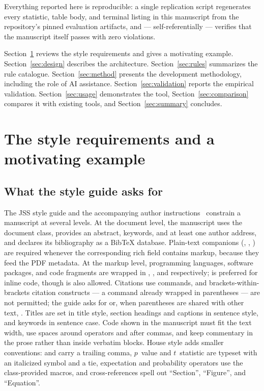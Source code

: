 \documentclass[nojss,article]{jss}
\providecommand{\BibTeX}{Bib\TeX{}}
\begin{document}
Everything reported here is reproducible: a single replication script
regenerates every statistic, table body, and terminal listing in this
manuscript from the repository's pinned evaluation artifacts, and ---
self-referentially --- verifies that the manuscript itself passes
 with zero violations.

Section~\ref{sec:styleguide} reviews the style requirements and gives
a motivating example. Section~\ref{sec:design} describes the
architecture. Section~\ref{sec:rules} summarizes the rule catalogue.
Section~\ref{sec:method} presents the development methodology,
including the role of AI assistance. Section~\ref{sec:validation}
reports the empirical validation. Section~\ref{sec:usage} demonstrates
the tool, Section~\ref{sec:comparison} compares it with existing
tools, and Section~\ref{sec:summary} concludes.

\section{The style requirements and a motivating example}
\label{sec:styleguide}

\subsection{What the style guide asks for}
\label{sec:requirements}

The JSS style guide and the accompanying author
instructions~\citep{jss_styleguide, jss_instructions} constrain a
manuscript at several levels. At the document level, the manuscript
uses the  document class, provides an abstract, keywords,
and at least one author address, and declares its bibliography as a
\BibTeX{} database. Plain-text companions
(,
,
) are required whenever the
corresponding rich field contains markup, because they feed the PDF
metadata. At the markup level, programming languages, software
packages, and code fragments are wrapped in
, , and
 respectively; 
is preferred for inline code, though  is
also allowed. Citations use  commands, and
brackets-within-brackets citation constructs --- a
 command already wrapped in parentheses
--- are not permitted; the guide asks for
 or, when parentheses are shared with
other text, . Titles are set in
title style, section headings and captions in sentence style, and
keywords in sentence case. Code shown in the manuscript must fit the
text width, use spaces around operators and after commas, and keep
commentary in the prose rather than inside verbatim blocks. House
style adds smaller conventions:  and  carry a
trailing comma, $p$~value and $t$~statistic are typeset with an
italicized symbol and a tie, expectation and probability operators use
the class-provided macros, and cross-references spell out
``Section'', ``Figure'', and ``Equation''.
\end{document}
